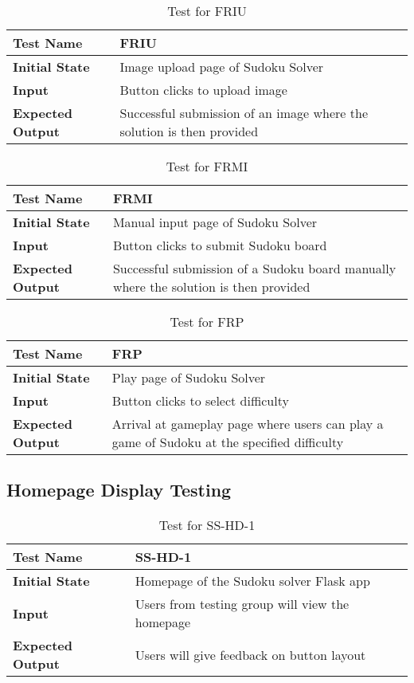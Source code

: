 \documentclass[11pt]{article}
\begin{document}
\begin{table}[H]
\centering
\begin{tabularx}{\textwidth}{p{5cm}X}
\hline
\textbf{Test Name}       &  FRIU\\ \hline
\textbf{Initial State}   &  Image upload page of Sudoku Solver\\ \hline
\textbf{Input}           &  Button clicks to upload image\\ \hline
\textbf{Expected Output} &  Successful submission of an image where the solution is then provided\\ \hline
\end{tabularx}
\caption{Test for FRIU}
\end{table}

\begin{table}[H]
\centering
\begin{tabularx}{\textwidth}{p{5cm}X}
\hline
\textbf{Test Name}       &  FRMI\\ \hline
\textbf{Initial State}   &  Manual input page of Sudoku Solver\\ \hline
\textbf{Input}           &  Button clicks to submit Sudoku board\\ \hline
\textbf{Expected Output} &  Successful submission of a Sudoku board manually where the solution is then provided\\ \hline
\end{tabularx}
\caption{Test for FRMI}
\end{table}

\begin{table}[H]
\centering
\begin{tabularx}{\textwidth}{p{5cm}X}
\hline
\textbf{Test Name}       &  FRP\\ \hline
\textbf{Initial State}   &  Play page of Sudoku Solver\\ \hline
\textbf{Input}           &  Button clicks to select difficulty\\ \hline
\textbf{Expected Output} &  Arrival at gameplay page where users can play a game of Sudoku at the specified difficulty\\ \hline
\end{tabularx}
\caption{Test for FRP}
\end{table}

\subsection{Homepage Display Testing}
\begin{table}[H]
\centering
\begin{tabularx}{\textwidth}{p{5cm}X}
\hline
\textbf{Test Name}       &  SS-HD-1\\ \hline
\textbf{Initial State}   &  Homepage of the Sudoku solver Flask app\\ \hline
\textbf{Input}           &  Users from testing group will view the homepage\\ \hline
\textbf{Expected Output} &  Users will give feedback on button layout\\ \hline
\end{tabularx}
\caption{Test for SS-HD-1}
\end{table}
\end{document}
